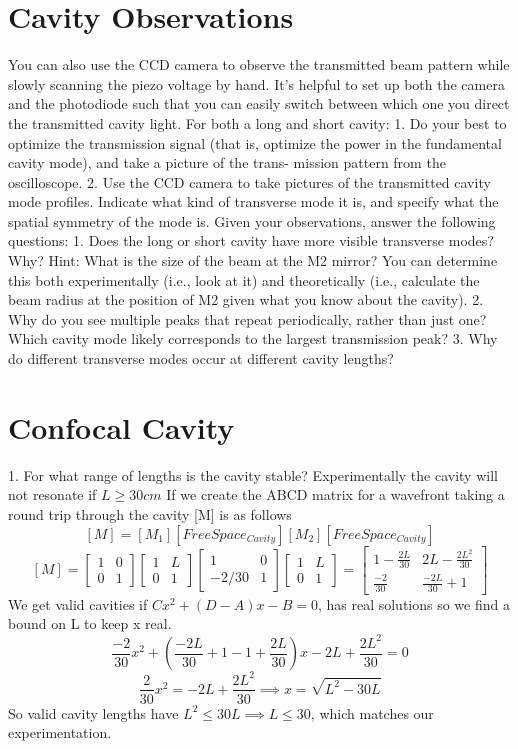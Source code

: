 \documentclass[11pt]{article}
\begin{document}
\section{Cavity Observations}

You can also use the CCD camera to observe the transmitted beam pattern while slowly scanning the piezo voltage by hand. It’s helpful to set up both the camera and the photodiode such that you can easily switch between which one you direct the transmitted cavity light. For both a long and short cavity:
1. Do your best to optimize the transmission signal (that is, optimize the power in the fundamental cavity mode), and take a picture of the trans- mission pattern from the oscilloscope.
2. Use the CCD camera to take pictures of the transmitted cavity mode profiles. Indicate what kind of transverse mode it is, and specify what the spatial symmetry of the mode is.
Given your observations, answer the following questions:
1. Does the long or short cavity have more visible transverse modes? Why? Hint: What is the size of the beam at the M2 mirror? You can determine this both experimentally (i.e., look at it) and theoretically (i.e., calculate the beam radius at the position of M2 given what you know about the cavity).
2. Why do you see multiple peaks that repeat periodically, rather than just one? Which cavity mode likely corresponds to the largest transmission peak?
3. Why do different transverse modes occur at different cavity lengths?

\section{Confocal Cavity}

1. For what range of lengths is the cavity stable?
Experimentally the cavity will not resonate if $L \geq 30cm$
If we create the ABCD matrix for a wavefront taking a round trip through the cavity [M] is as follows
$$ [M] = [M_1][FreeSpace_{Cavity}][M_2][FreeSpace_{Cavity}]$$
$$ [M] = \begin{bmatrix} 1 & 0 \\ 0 & 1  \end{bmatrix}  \begin{bmatrix}1 & L \\0 & 1 \end{bmatrix} \begin{bmatrix} 1 & 0 \\ -2/30 & 1  \end{bmatrix} \begin{bmatrix} 1 & L \\ 0 & 1  \end{bmatrix} = \begin{bmatrix} 1 - \frac{2L}{30} & 2L - \frac{2L^2}{30} \\ \frac{-2}{30} & \frac{-2L}{30} + 1  \end{bmatrix}$$
We get valid cavities if $Cx^2 + (D-A)x - B = 0$, has real solutions so we find a bound on L to keep x real. 
$$ \frac{-2}{30}x^2 + (\frac{-2L}{30} + 1 - 1 + \frac{2L}{30} )x - 2L + \frac{2L^2}{30} = 0 $$
$$ \frac{2}{30}x^2 = -2L + \frac{2L^2}{30} \implies x = \sqrt{L^2 - 30L}$$
So valid cavity lengths have $L^2 \leq 30L \implies L \leq 30 $, which matches our experimentation.
\end{document}
